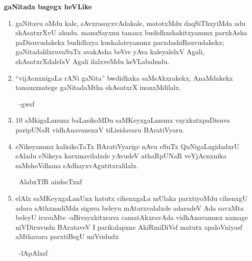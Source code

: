 \begin{center}
{\bf gaNitada bagegx heVLike} 
\end{center}
\begin{enumerate}[\rm 1)]
\item gaNitavu oMdu kale, sAvxrasayxvAdakale, matotxMdu daqSiThxyiMda adu shAsatxrXvU ahudu. manuSayxnu tananx budidhxshakitxyanunx parxkAsha paDisuvudakekx budidhxya kushalateyanunx parxdashiRsuvudakekx; gaNitadalilxruvaSuTx avakAsha beVre yAva kaleyalelxV Agali, shAsatxrXdalelxV Agali ilalxveMdu heVLabahudu.

\item ``vijAcnxnigaLa rANi gaNita'' bwdidhxka saMsAkxrakekx, AnaMdakekx tanamxnatege gaNitadaMtha shAsatxrX inonxMdilalx.

~\hfill -gwsf

\item {\rm 10} aMkigaLanunx baLasikoMDu saMKeyxgaLanunx vayxkatxpaDisuva paripUNaR vidhAna\-vanenxV tiLisidavaru BAratiVyaru.

\item eNikeyanunx kalisikoTaTx BAratiVyarige nAvu eSuTx QuNigaLagidadxrU sAladu eNikeya karxmavilalxde yAvudeV athaRpUNaR veYjAcnxnika saMshoVdhana sAdhayx\-vAgutitxralilalx.

~\hfill AlabxTfR ainfseTxnf

\item elAlx saMKeyxgaLanUnx hatutx cihenxgaLa mUlaka parxtiyoMdu cihenxgU adara sAthxnadiMda siguva beleyu mAtarxvalalxde adaradeV Ada savxMta beleyU iruvaMte -aBivayxkitxsuva camatAkxravAda vidhAnavanunx namage niVDiruvudu BArataveV I parikalapxne AkiRmiDiVsf matutx apaloVniyasf aMthavara parxtiBegU miVridudx

~\hfill -lApAlxsf
\end{enumerate}
